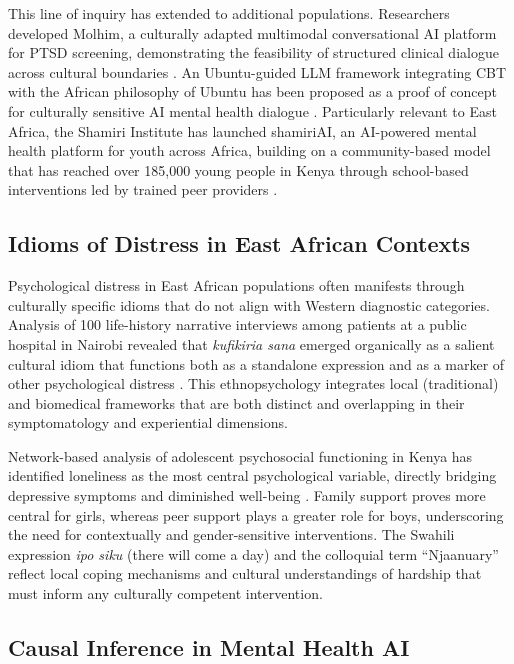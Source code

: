 \documentclass[12pt,a4paper]{article}
\begin{document}
This line of inquiry has extended to additional populations. Researchers developed Molhim, a culturally adapted multimodal conversational AI platform for PTSD screening, demonstrating the feasibility of structured clinical dialogue across cultural boundaries \citep{Ozel2026}. An Ubuntu-guided LLM framework integrating CBT with the African philosophy of Ubuntu has been proposed as a proof of concept for culturally sensitive AI mental health dialogue \citep{Ubuntu2026}. Particularly relevant to East Africa, the Shamiri Institute has launched shamiriAI, an AI-powered mental health platform for youth across Africa, building on a community-based model that has reached over 185,000 young people in Kenya through school-based interventions led by trained peer providers \citep{Shamiri2025}.

\subsection{Idioms of Distress in East African Contexts}

Psychological distress in East African populations often manifests through culturally specific idioms that do not align with Western diagnostic categories. Analysis of 100 life-history narrative interviews among patients at a public hospital in Nairobi revealed that \textit{kufikiria sana} emerged organically as a salient cultural idiom that functions both as a standalone expression and as a marker of other psychological distress \citep{Mendenhall2019}. This ethnopsychology integrates local (traditional) and biomedical frameworks that are both distinct and overlapping in their symptomatology and experiential dimensions.

Network-based analysis of adolescent psychosocial functioning in Kenya has identified loneliness as the most central psychological variable, directly bridging depressive symptoms and diminished well-being \citep{Ndetei2025}. Family support proves more central for girls, whereas peer support plays a greater role for boys, underscoring the need for contextually and gender-sensitive interventions. The Swahili expression \textit{ipo siku} (there will come a day) and the colloquial term ``Njaanuary'' reflect local coping mechanisms and cultural understandings of hardship that must inform any culturally competent intervention.

\subsection{Causal Inference in Mental Health AI}
\end{document}
